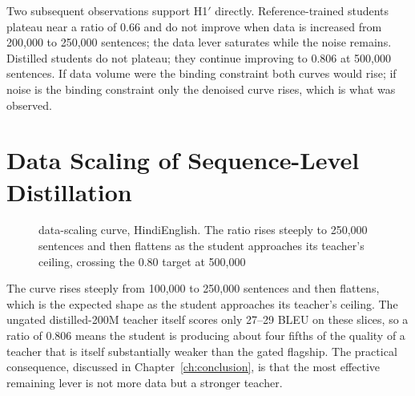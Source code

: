 Two subsequent observations support H1$'$ directly. Reference-trained students
plateau near a ratio of 0.66 and do not improve when data is increased from
200{,}000 to 250{,}000 sentences; the data lever saturates while the noise
remains. Distilled students do not plateau; they continue improving to 0.806 at
500{,}000 sentences. If data volume were the binding constraint both curves would
rise; if noise is the binding constraint only the denoised curve rises, which is
what was observed.

\section{Data Scaling of Sequence-Level Distillation}
\label{sec:scaling}

\begin{figure}[H]
\centering
{}
\caption{\seqkd{} data-scaling curve, Hindi\arrowto{}English. The ratio rises
steeply to 250{,}000 sentences and then flattens as the student approaches its
teacher's ceiling, crossing the 0.80 target at 500{,}000}
\label{fig:scaling}
\end{figure}

The curve rises steeply from 100{,}000 to 250{,}000 sentences and then flattens,
which is the expected shape as the student approaches its teacher's ceiling. The
ungated distilled-200M teacher itself scores only 27--29 BLEU on these slices, so
a ratio of 0.806 means the student is producing about four fifths of the quality
of a teacher that is itself substantially weaker than the gated flagship. The
practical consequence, discussed in Chapter~\ref{ch:conclusion}, is that the
most effective remaining lever is not more data but a stronger teacher.

